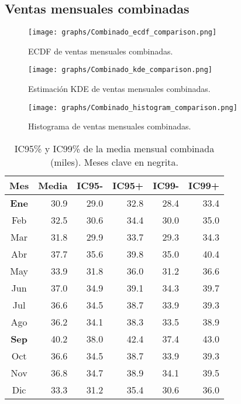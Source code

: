 \documentclass[12pt,a4paper]{article}
\begin{document}
\subsection{Ventas mensuales combinadas}
\begin{figure}[H]
  \centering
  \texttt{[image: graphs/Combinado\_ecdf\_comparison.png]}
  \caption{ECDF de ventas mensuales combinadas.}
\end{figure}
\begin{figure}[H]
  \centering
  \texttt{[image: graphs/Combinado\_kde\_comparison.png]}
  \caption{Estimación KDE de ventas mensuales combinadas.}
\end{figure}
\begin{figure}[H]
  \centering
  \texttt{[image: graphs/Combinado\_histogram\_comparison.png]}
  \caption{Histograma de ventas mensuales combinadas.}
\end{figure}
\begin{table}[H]
  \centering
  \small
  \begin{tabular}{c rrrrr}
    \toprule
    Mes & Media & IC95- & IC95+ & IC99- & IC99+\\
    \midrule
    \textbf{Ene} & 30.9 & 29.0 & 32.8 & 28.4 & 33.4\\
    Feb & 32.5 & 30.6 & 34.4 & 30.0 & 35.0\\
    Mar & 31.8 & 29.9 & 33.7 & 29.3 & 34.3\\
    Abr & 37.7 & 35.6 & 39.8 & 35.0 & 40.4\\
    May & 33.9 & 31.8 & 36.0 & 31.2 & 36.6\\
    Jun & 37.0 & 34.9 & 39.1 & 34.3 & 39.7\\
    Jul & 36.6 & 34.5 & 38.7 & 33.9 & 39.3\\
    Ago & 36.2 & 34.1 & 38.3 & 33.5 & 38.9\\
    \textbf{Sep} & 40.2 & 38.0 & 42.4 & 37.4 & 43.0\\
    Oct & 36.6 & 34.5 & 38.7 & 33.9 & 39.3\\
    Nov & 36.8 & 34.7 & 38.9 & 34.1 & 39.5\\
    Dic & 33.3 & 31.2 & 35.4 & 30.6 & 36.0\\
    \bottomrule
  \end{tabular}
  \caption{IC95\% y IC99\% de la media mensual combinada (miles). Meses clave en negrita.}
\end{table}
\end{document}

